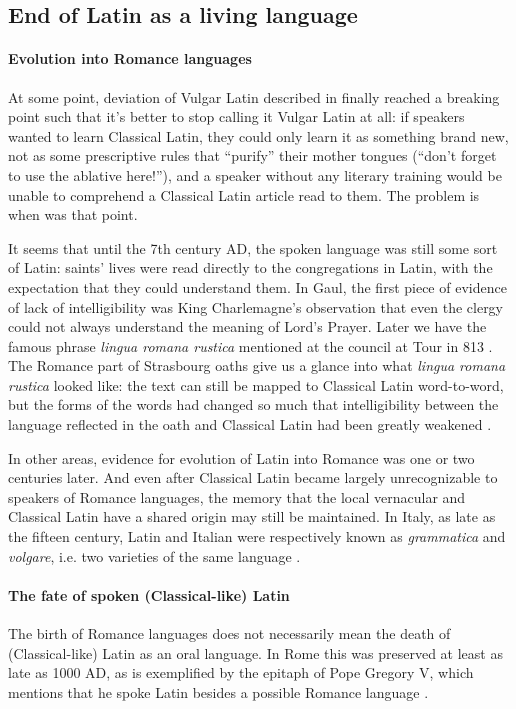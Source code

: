 \documentclass[a4paper, oneside, 12pt]{report}
\newcommand*{\citepage}[1]{p.~{#1}}
\newcommand*{\citepages}[1]{pp.~{#1}}
\newcommand{\form}[1]{\emph{#1}}
\begin{document}
\subsection{End of Latin as a living language}

\paragraph*{Evolution into Romance languages}
At some point, deviation of Vulgar Latin described in  
finally reached a breaking point
such that it's better to stop calling it Vulgar Latin at all:
if speakers wanted to learn Classical Latin,
they could only learn it as something brand new,
not as some prescriptive rules that ``purify'' their mother tongues 
(``don't forget to use the ablative here!''),
and a speaker without any literary training would be unable to comprehend 
a Classical Latin article read to them.
The problem is when was that point.

It seems that until the 7th century AD, the spoken language was still some sort of Latin:
saints' lives were read directly to the congregations in Latin,
with the expectation that they could understand them.
In Gaul, the first piece of evidence of lack of intelligibility
was King Charlemagne's observation that even the clergy 
could not always understand the meaning of Lord's Prayer.
Later we have the famous phrase \form{lingua romana rustica}
mentioned at the council at Tour in 813
\citep[\citepage{114}]{herman2010vulgar}.
The Romance part of Strasbourg oaths give us a glance into what \form{lingua romana rustica} looked like:
the text can still be mapped to Classical Latin word-to-word,
but the forms of the words had changed so much
that intelligibility between the language reflected in the oath and Classical Latin
had been greatly weakened \citep[\citepages{300-301}]{clackson2011blackwell}.

In other areas, evidence for evolution of Latin into Romance was one or two centuries later.
And even after Classical Latin became largely unrecognizable
to speakers of Romance languages,
the memory that the local vernacular and Classical Latin have a shared origin
may still be maintained.
In Italy, as late as the fifteen century,
Latin and Italian were respectively known as \form{grammatica} and \form{volgare},
i.e. two varieties of the same language
\citep[\citepage{146}]{leonhardt2013latin}.

\paragraph*{The fate of spoken (Classical-like) Latin}
The birth of Romance languages does not necessarily mean 
the death of (Classical-like) Latin as an oral language.
In Rome this was preserved at least as late as 1000 AD,
as is exemplified by the epitaph of Pope Gregory V,
which mentions that he spoke Latin besides a possible Romance language 
\citep[\citepage{268}]{clackson2011blackwell}.
\end{document}
